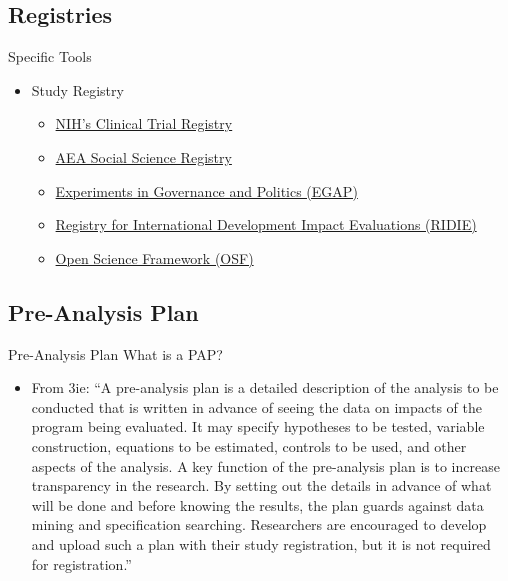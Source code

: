 \documentclass{beamer}
\begin{document}
\subsection{Registries}
\begin{frame}{Specific Tools}
\begin{itemize}[<+->]
\item Study Registry
\begin{itemize}
 \item \href{http://clinicaltrials.gov}{NIH's Clinical Trial Registry}
 \item \href{http://www.socialscienceregistry.org}{AEA Social Science Registry}
 \item \href{http://e-gap.org/design-registration}{Experiments in Governance and Politics (EGAP)}
 \item \href{http://ridie.3ieimpact.org/}{Registry for International Development Impact Evaluations (RIDIE)}
 \item \href{http://osf.io}{Open Science Framework (OSF) }
\end{itemize}
\end{itemize}
\end{frame}

\subsection{Pre-Analysis Plan}
\begin{frame}{Pre-Analysis Plan}
What is a PAP?
\begin{itemize}
\item
From 3ie: ``A pre-analysis plan is a detailed description of the analysis to be conducted that is written in advance of seeing the data on impacts of the program being evaluated. It may specify hypotheses to be tested, variable construction, equations to be estimated, controls to be used, and other aspects of the analysis. A key function of the pre-analysis plan is to increase transparency in the research. By setting out the details in advance of what will be done and before knowing the results, the plan guards against data mining and specification searching. Researchers are encouraged to develop and upload such a plan with their study registration, but it is not required for registration.''
\end{itemize}
\end{frame}
\end{document}
